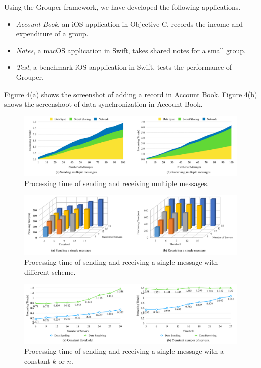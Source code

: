 \documentclass[twocolumn,10pt]{article}
\begin{document}
Using the Grouper framework, we have developed the following applications. 

\begin{itemize}
	\setlength{\itemsep}{1pt}
	\setlength{\parskip}{0pt}
	\setlength{\parsep}{0pt}
	\item \emph{Account Book}, an iOS application in Objective-C, records the income and expenditure of a group.
	\item \emph{Notes}, a macOS application in Swift, takes shared notes for a small group.
	\item \emph{Test}, a benchmark iOS aapplication in Swift, tests the performance of Grouper.
\end{itemize}

Figure 4(a) shows the screenshot of adding a record in Account Book. Figure 4(b) shows the screenshoot of data synchronization in Account Book.

\begin{figure}[t]
	\centering
	\includegraphics[scale=0.13]{multiple_messages}
	\caption{Processing time of sending and receiving multiple messages.}
\end{figure}

\begin{figure}[t]
	\centering
	\includegraphics[scale=0.35]{3d}
	\caption{Processing time of sending and receiving a single message with different scheme.}
\end{figure}

\begin{figure}[t]
	\centering
	\includegraphics[scale=0.13]{constant_k_n}
	\caption{Processing time of sending and receiving a single message with a constant ${k}$ or ${n}$.}
\end{figure}
\end{document}
